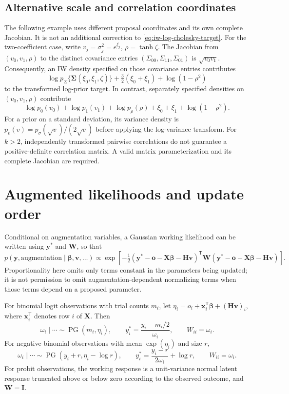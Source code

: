 \documentclass[11pt]{article}
\newcommand{\by}{\bm{y}}
\newcommand{\bx}{\bm{x}}
\newcommand{\bo}{\bm{o}}
\newcommand{\bv}{\bm{v}}
\newcommand{\bbeta}{\bm{\beta}}
\newcommand{\bH}{\bm{H}}
\newcommand{\bI}{\bm{I}}
\newcommand{\bW}{\bm{W}}
\newcommand{\bX}{\bm{X}}
\newcommand{\bSigma}{\bm{\Sigma}}
\newcommand{\trans}{^{\mathsf T}}
\begin{document}
\subsection{Alternative scale and correlation coordinates}
The following example uses different proposal coordinates and its own complete
Jacobian. It is not an additional correction to
\eqref{eq:iw-log-cholesky-target}.
For the two-coefficient case, write $v_j=\sigma_j^2=e^{\xi_j}$,
$\rho=\tanh\zeta$. The Jacobian from $(v_0,v_1,\rho)$ to the distinct covariance
entries $(\Sigma_{00},\Sigma_{11},\Sigma_{01})$ is $\sqrt{v_0v_1}$.
Consequently, an IW density specified on those covariance entries contributes
\begin{equation}\label{eq:iw-jacobian}
 \log p_{\Sigma}\{\bSigma(\xi_0,\xi_1,\zeta)\}
 +\tfrac32(\xi_0+\xi_1)+\log(1-\rho^2)
\end{equation}
to the transformed log-prior target. In contrast, separately specified densities
on $(v_0,v_1,\rho)$ contribute
\begin{equation}\label{eq:separation-jacobian}
 \log p_0(v_0)+\log p_1(v_1)+\log p_\rho(\rho)
 +\xi_0+\xi_1+\log(1-\rho^2).
\end{equation}
For a prior on a standard deviation, its variance density is
$p_v(v)=p_\sigma(\sqrt v)/(2\sqrt v)$ before applying the log-variance transform.
For $k>2$, independently transformed pairwise correlations do not guarantee a
positive-definite correlation matrix. A valid matrix parameterization and its
complete Jacobian are required.

\section{Augmented likelihoods and update order}
Conditional on augmentation variables, a Gaussian working likelihood can be
written using $\by^*$ and $\bW$, so that
\begin{equation}
 p(\by,\text{augmentation}\mid\bbeta,\bv,\ldots)
 \propto\exp\left[-\tfrac12
 (\by^*-\bo-\bX\bbeta-\bH\bv)\trans\bW
 (\by^*-\bo-\bX\bbeta-\bH\bv)\right].
\end{equation}
Proportionality here omits only terms constant in the parameters being updated;
it is not permission to omit augmentation-dependent normalizing terms when those
terms depend on a proposed parameter.

For binomial logit observations with trial counts $m_i$, let
$\eta_i=o_i+\bx_i\trans\bbeta+(\bH\bv)_i$, where
$\bx_i\trans$ denotes row $i$ of $\bX$. Then
\begin{equation}
 \omega_i\mid\cdots\sim\operatorname{PG}(m_i,\eta_i),\qquad
 y_i^*=\frac{y_i-m_i/2}{\omega_i},\qquad W_{ii}=\omega_i.
\end{equation}
For negative-binomial observations with mean $\exp(\eta_i)$ and size $r$,
\begin{equation}\label{eq:nb-working}
 \omega_i\mid\cdots\sim\operatorname{PG}(y_i+r,\eta_i-\log r),\qquad
 y_i^*=\frac{y_i-r}{2\omega_i}+\log r,\qquad W_{ii}=\omega_i.
\end{equation}
For probit observations, the working response is a unit-variance normal latent
response truncated above or below zero according to the observed outcome, and
$\bW=\bI$.
\end{document}
